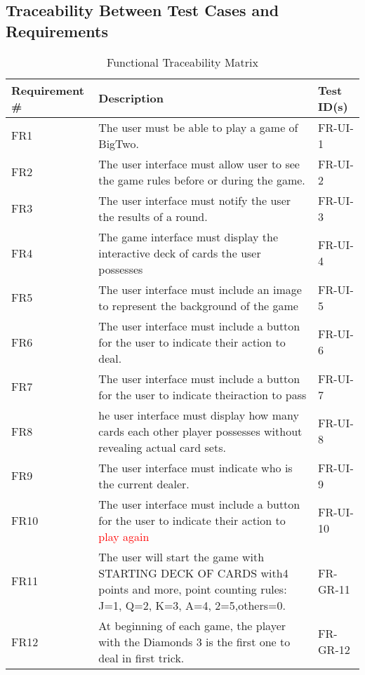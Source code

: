 \documentclass[12pt, titlepage]{article}
\begin{document}
\subsection{Traceability Between Test Cases and Requirements}
\begin{table}[h!]
\centering
\caption{Functional Traceability Matrix}
\label{table:1}
\begin{tabular}{|p{2.5cm} p{10cm} p{2.5cm}|} 
 \hline
 Requirement \# & Description & Test ID(s) \\ 
 \hline
 FR1 & The user must be able to play a game of BigTwo. & FR-UI-1 \\ 
 FR2 & The  user  interface  must  allow  user  to  see  the  game  rules  before  or during the game. & FR-UI-2 \\ 
 FR3 & The user interface must notify the user the results of a round. & FR-UI-3 \\ 
 FR4 & The game interface must display the interactive deck of cards the user possesses & FR-UI-4 \\ 
 FR5 & The user interface must include an image to represent the background of the game & FR-UI-5 \\ 
 FR6 & The user interface must include a button for the user to indicate their action to deal. & FR-UI-6 \\ 
 FR7 & The user interface must include a button for the user to indicate theiraction to pass & FR-UI-7 \\ 
 FR8 & he  user  interface  must  display  how  many  cards  each  other player possesses without revealing actual card sets. & FR-UI-8 \\
 FR9 & The user interface must indicate who is the current dealer. & FR-UI-9 \\ 
 FR10 & The user interface must include a button for the user to indicate their action to \textcolor{red}{play again} & FR-UI-10 \\ 
 FR11 & The user will start the game with STARTING DECK OF CARDS with4 points and more, point counting rules:  J=1, Q=2, K=3, A=4, 2=5,others=0. & FR-GR-11 \\ 
 FR12 & At beginning of each game, the player with the Diamonds 3 is the first one to deal in first trick. & FR-GR-12 \\ 
 
 \hline
\end{tabular}
\end{table}

\newpage
\end{document}
